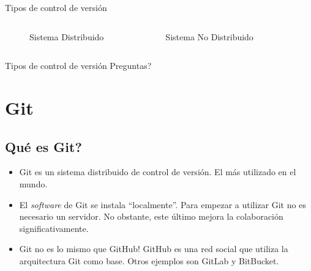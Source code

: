 \documentclass[10pt, aspectratio=169]{beamer}
\begin{document}
\begin{frame}{Tipos de control de versión}
	\begin{columns}[T, onlytextwidth]
		\begin{figure}
			\centering
			\caption{Sistema Distribuido}
		\end{figure}
		\begin{figure}
			\centering
			\caption{Sistema No Distribuido}
		\end{figure}
	\end{columns}
\end{frame}

\begin{frame}[standout]{Tipos de control de versión}
	Preguntas?
\end{frame}
\section{Git}
\subsection{Qué es Git?}

\begin{frame}[<+->]{\subsecname}
	\begin{itemize}
		\item Git es un sistema distribuido de control de versión. El más utilizado en el mundo.
		\vfill \item El \emph{software} de Git se instala ``localmente''. \textcolor{UBCgrey}{Para empezar a utilizar Git no es necesario un servidor. No obstante, este último mejora la colaboración significativamente. }
		\vfill \item \alert{Git no es lo mismo que GitHub!} \textcolor{UBCgrey}{GitHub es una red social que utiliza la arquitectura Git como base. Otros ejemplos son GitLab y BitBucket.}
	\end{itemize}
\end{frame}
\end{document}
